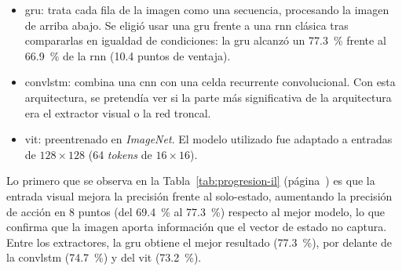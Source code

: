 \begin{itemize}
  \item \gls{gru}: trata cada fila de la imagen como
  una secuencia, procesando la imagen de arriba abajo. Se eligió usar una \gls{gru} frente a una \gls{rnn}
  clásica tras compararlas en igualdad de condiciones: la \gls{gru} alcanzó
  un \qty{77.3}{\percent} frente al \qty{66.9}{\percent} de la \gls{rnn} (\num{10.4} puntos de ventaja).
  \item \gls{convlstm}: combina una \gls{cnn} con una celda
  recurrente convolucional. Con esta arquitectura, se pretendía ver si la parte más significativa
  de la arquitectura era el extractor visual o la red troncal.
  \item \gls{vit}: preentrenado en \textit{ImageNet}. El modelo utilizado fue
  adaptado a entradas de $\num{128}\times\num{128}$ (\num{64} \textit{\glspl{token}} de $\num{16}\times\num{16}$).
\end{itemize}

\begin{table}[htbp]
  \centering
  \caption[Comparación de extractores visuales]{Comparación de los extractores visuales evaluados en la iteración.
  La variante solo-estado sirve de referencia para la mejora que aporta la entrada visual. Como resultado, 
  la \gls{gru} obtiene la mayor precisión de acción (\qty{77.3}{\percent}) y se selecciona como extractor final.}
  \label{tab:progresion-il}
\end{table}

Lo primero que se observa en la Tabla~\ref{tab:progresion-il} (página~\pageref{tab:progresion-il}) es que la entrada visual mejora la
precisión frente al solo-estado, aumentando la precisión de acción en \num{8} puntos (del \qty{69.4}{\percent} al \qty{77.3}{\percent})
respecto al mejor modelo, lo que confirma que la imagen aporta información que el vector de estado
no captura. Entre los extractores, la \gls{gru} obtiene el mejor resultado
(\qty{77.3}{\percent}), por delante de la \gls{convlstm} (\qty{74.7}{\percent}) y del \gls{vit} (\qty{73.2}{\percent}).

